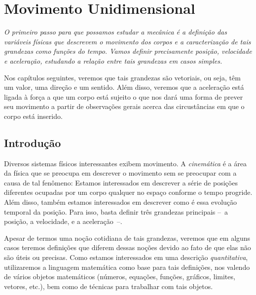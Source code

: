 \chapter{Movimento Unidimensional}
\label{Chap:MovimentoUnidimensional}



\begin{fullwidth}
{\it
O primeiro passo para que possamos estudar a mecânica é a definição das variáveis físicas que descrevem o movimento dos corpos e a caracterização de tais grandezas como funções do tempo. Vamos definir precisamente posição, velocidade e aceleração, estudando a relação entre tais grandezas em casos simples. 

Nos capítulos seguintes, veremos que tais grandezas são vetoriais, ou seja, têm um valor, uma direção e um sentido. Além disso, veremos que a aceleração está ligada à força a que um corpo está sujeito o que nos dará uma forma de prever seu movimento a partir de observações gerais acerca das circustâncias em que o corpo está inserido.
}
\end{fullwidth}

\section{Introdução}

Diversos sistemas físicos interessantes exibem movimento. A \emph{cinemática} é a área da física que se preocupa em descrever o movimento sem se preocupar com a causa de tal fenômeno: Estamos interessados em descrever a série de posições diferentes ocupadas por um corpo qualquer no espaço conforme o tempo progride. Além disso, também estamos interessados em descrever como é essa evolução temporal da posição. Para isso, basta definir três grandezas principais --~a posição, a velocidade, e a aceleração~--.

Apesar de termos uma noção cotidiana de tais grandezas, veremos que em alguns casos teremos definições que diferem dessas noções devido ao fato de que elas não são úteis ou precisas. Como estamos interessados em uma descrição \emph{quantitativa}, utilizaremos a linguagem matemática como base para tais definições, nos valendo de vários objetos matemáticos (números, equações, funções, gráficos, limites, vetores, etc.), bem como de técnicas para trabalhar com tais objetos.

